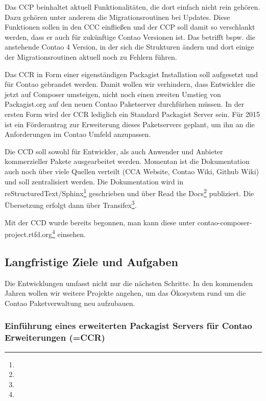 \documentclass[
paper=a4,
draft=false,%
fontsize=10pt%
]{scrartcl}
\begin{document}
Das CCP beinhaltet aktuell Funktionalitäten, die dort einfach nicht rein gehören. Dazu gehören unter anderem die Migrationsroutinen bei Updates. Diese Funktionen sollen in den CCC einfließen und der CCP soll damit so verschlankt werden, dass er auch für zukünftige Contao Versionen ist. Das betrifft bspw. die anstehende Contao 4 Version, in der sich die Strukturen ändern und dort einige der Migrationsroutinen aktuell noch zu Fehlern führen.

Das CCR in Form einer eigenständigen Packagist Installation soll aufgesetzt und für Contao gebrandet werden. Damit wollen wir verhindern, dass Entwickler die jetzt auf Composer umsteigen, nicht noch einen zweiten Umstieg von Packagist.org auf den neuen Contao Paketserver durchfürhen müssen. In der ersten Form wird der CCR lediglich ein Standard Packagist Server sein. Für 2015 ist ein Förderantrag zur Erweiterung dieses Paketservers geplant, um ihn an die Anforderungen im Contao Umfeld anzupassen.

Die CCD soll sowohl für Entwickler, als auch Anwender und Anbieter kommerzieller Pakete ausgearbeitet werden. Momentan ist die Dokumentation auch noch über viele Quellen verteilt (CCA Website, Contao Wiki, Github Wiki) und soll zentralisiert werden. Die Dokumentation wird in reStructuredText/Sphinx\footnote{} geschrieben und über Read the Docs\footnote{} publiziert. Die Übersetzung erfolgt dann über Transifex\footnote{}.

Mit der CCD wurde bereits begonnen, man kann diese unter contao-composer-project.rtfd.org\footnote{} einsehen.

\pagebreak
\subsection{Langfristige Ziele und Aufgaben}
\label{sec:long-term-goals}

Die Entwicklungen umfasst nicht nur die nächsten Schritte. In den kommenden Jahren wollen wir weitere Projekte angehen, um das Ökosystem rund um die Contao Paketverwaltung neu aufzubauen.

\subsubsection{Einführung eines erweiterten Packagist Servers für Contao Erweiterungen (=CCR)}
\end{document}
